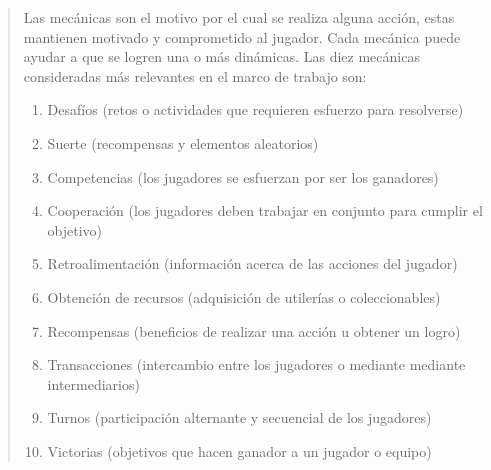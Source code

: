  \begin{quote}
    Las mecánicas son el motivo por el cual se realiza alguna acción, estas mantienen
    motivado y comprometido al jugador. Cada mecánica puede ayudar a que se logren
    una o más dinámicas. Las diez mecánicas consideradas más relevantes en el marco
    de trabajo son:

    \begin{enumerate}
        \item Desafíos (retos o actividades que requieren esfuerzo para resolverse)
        \item Suerte (recompensas y elementos aleatorios)
        \item Competencias (los jugadores se esfuerzan por ser los ganadores)
        \item Cooperación (los jugadores deben trabajar en conjunto para cumplir el objetivo)
        \item Retroalimentación (información acerca de las acciones del jugador)
        \item Obtención de recursos (adquisición de utilerías o coleccionables)
        \item Recompensas (beneficios de realizar una acción u obtener un logro)
        \item Transacciones (intercambio entre los jugadores o mediante mediante intermediarios)
        \item Turnos (participación alternante y secuencial de los jugadores)
        \item Victorias (objetivos que hacen ganador a un jugador o equipo)\\
    \end{enumerate}
 \end{quote}


